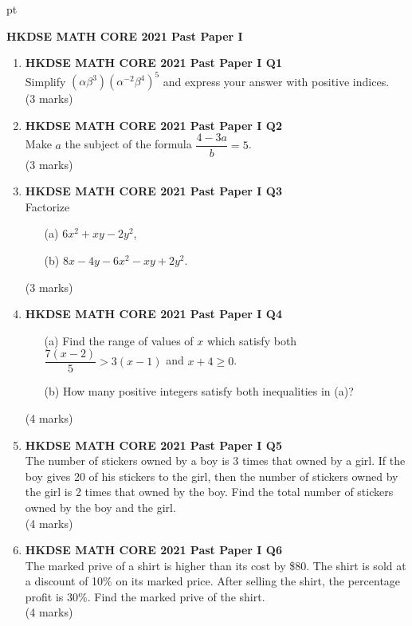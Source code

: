 \documentclass[12pt]{article}
\begin{document}
 pt
\begin{center}
	{\large \bf HKDSE MATH CORE 2021 Past Paper I}\\
	\vspace{2 mm}

\end{center}
\vspace{0.05cm}

\begin{enumerate}
	\item \textbf{HKDSE MATH CORE 2021 Past Paper I Q1}\\
	Simplify $(\alpha \beta^3)(\alpha^{-2}\beta^4)^5$ and express your answer with positive indices. \\(3 marks)	

	\item \textbf{HKDSE MATH CORE 2021 Past Paper I Q2}\\
	Make $a$ the subject of the formula $\dfrac{4 - 3a}{b} = 5$. \\(3 marks)

	\item \textbf{HKDSE MATH CORE 2021 Past Paper I Q3}\\
	Factorize
	\begin{enumerate}
		\item[(a)] $6x^2 + xy - 2y^2$,
		\item[(b)] $8x - 4y - 6x^2 - xy + 2y^2$.
	\end{enumerate}
	(3 marks)

	\item \textbf{HKDSE MATH CORE 2021 Past Paper I Q4}
	\begin{enumerate}
		\item[(a)] Find the range of values of $x$ which satisfy both $\dfrac{7(x - 2)}{5} > 3(x - 1)$ and $x + 4 \geq 0$.
		\item[(b)] How many positive integers satisfy both inequalities in (a)?
	\end{enumerate}
	(4 marks)


	\item \textbf{HKDSE MATH CORE 2021 Past Paper I Q5}\\
	The number of stickers owned by a boy is 3 times that owned by a girl. If the boy gives 20 of his stickers to the girl, then the number of stickers owned by the girl is 2 times that owned by the boy. Find the total number of stickers owned by the boy and the girl. \\(4 marks)

	\item \textbf{HKDSE MATH CORE 2021 Past Paper I Q6}\\
	The marked prive of a shirt is higher than its cost by \$80. The shirt is sold at a discount of 10\% on its marked price. After selling the shirt, the percentage profit is 30\%. Find the marked prive of the shirt. \\(4 marks)


\end{enumerate}
\end{document}
